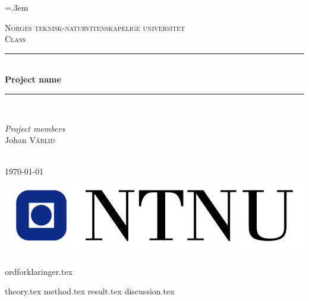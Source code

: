 \documentclass[a4paper]{report}
\begin{document}
\begingroup\emergencystretch=.3em
\begin{titlepage}
    \newcommand{\HRule}{\rule{\linewidth}{0.5mm}} %
    
    \center %
    
    \textsc{\LARGE Norges teknisk-naturvitenskapelige universitet}\\[1.5cm] %
    \textsc{\Large Class}\\[0.5cm] %
    
    \HRule \\[0.7cm]
    { \huge \bfseries Project name}\\[0.4cm]
    \HRule \\[1.5cm]
    
    \begin{minipage}{0.75\textwidth}
        \emph{Project members}\\
        Johan       \textsc{Vårlid}
    \end{minipage}
    
    ~
    \newline\\
    {\large \today}\\[2cm]
    
    
    \includegraphics[scale=1]{General/figures/ntnu-logo.jpg}\\[1cm] 
    \vfill %

\end{titlepage}


\listoftodos
\newpage
\tableofcontents

{ordforklaringer.tex}
\newpage
{}%



{theory.tex}
{method.tex}
{result.tex}
{discussion.tex}




\newpage %

\end{document}

